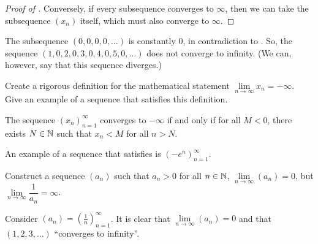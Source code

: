 \begin{problem}
\begin{enumerate}[label=(\alph*)]
\begin{proof}[Proof of ]
          Conversely, if every subsequence converges to $\infty$, then we can take the
          subsequence $(x_{n})$ itself, which must also converge to $\infty$.
        \end{proof}

        The subsequence $(0, 0, 0, 0, \ldots)$ is constantly $0$, in contradiction to 
        . So,
        the sequence $(1, 0, 2, 0, 3, 0, 4, 0, 5, 0, \ldots)$ does not converge 
        to infinity. (We can, however, say that this sequence diverges.)

  \end{enumerate}
\end{problem}

\begin{problem}
  Create a rigorous definition for the mathematical statement 
  $\lim\limits_{n \to \infty} x_{n} = -\infty$. Give an example of a 
  sequence that satisfies this definition. 

    \begin{definition}
      \label{def:convergence-to-neg-infty}
      The sequence $(x_{n})_{n=1}^{\infty}$ converges to $-\infty$ if and only if
      for all $M < 0$, there exists $N \in \mathbb{N}$ such that $x_{n} < M$ 
      for all $n > N$.
    \end{definition}

    An example of a sequence that satisfies  is
    $(-e^{n})_{n=1}^{\infty}$.
\end{problem}

\begin{problem}
  Construct a sequence $(a_{n})$ such that $a_{n} > 0$ for all $n \in \mathbb{N}$,
  $\lim\limits_{n \to \infty} (a_{n}) = 0$, but
  $\lim\limits_{n \to \infty} \dfrac{1}{a_{n}} = \infty$.

  \vspace{\baselineskip}

    Consider $(a_{n}) = \left( \frac{1}{n} \right)_{n=1}^{\infty}$. It is clear that
    $\lim\limits_{n \to \infty} (a_{n}) = 0$ and that $(1, 2, 3, \ldots)$ ``converges to infinity''.

\end{problem}

